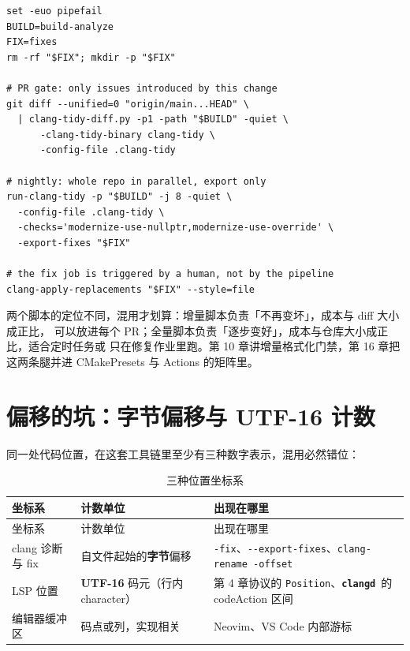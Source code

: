 \documentclass[12pt,a4paper,fontset=fandol]{ctexbook}
\newcommand{\Tp}[1]{\texttt{#1}}
\newcommand{\Opt}[1]{\texttt{-\/-#1}}
\newcommand{\Lib}[1]{\textbf{\texttt{#1}}}
\newcommand{\CD}{\Lib{clangd}}
\begin{document}
\begin{lstlisting}[style=shellstyle,caption={CI 中增量门禁与夜间全量的组合骨架},label={lst:ch14-parallel}]
set -euo pipefail
BUILD=build-analyze
FIX=fixes
rm -rf "$FIX"; mkdir -p "$FIX"

# PR gate: only issues introduced by this change
git diff --unified=0 "origin/main...HEAD" \
  | clang-tidy-diff.py -p1 -path "$BUILD" -quiet \
      -clang-tidy-binary clang-tidy \
      -config-file .clang-tidy

# nightly: whole repo in parallel, export only
run-clang-tidy -p "$BUILD" -j 8 -quiet \
  -config-file .clang-tidy \
  -checks='modernize-use-nullptr,modernize-use-override' \
  -export-fixes "$FIX"

# the fix job is triggered by a human, not by the pipeline
clang-apply-replacements "$FIX" --style=file
\end{lstlisting}

两个脚本的定位不同，混用才划算：增量脚本负责「不再变坏」，成本与 diff 大小成正比，
可以放进每个 PR；全量脚本负责「逐步变好」，成本与仓库大小成正比，适合定时任务或
只在修复作业里跑。第 10 章讲增量格式化门禁，第 16 章把这两条腿并进
CMakePresets 与 Actions 的矩阵里。

\section{偏移的坑：字节偏移与 UTF-16 计数}\label{sec:ch14-s4}

同一处代码位置，在这套工具链里至少有三种数字表示，混用必然错位：

\begin{longtable}{>{\raggedright\arraybackslash}p{}>{\raggedright\arraybackslash}p{}>{\raggedright\arraybackslash}p{}}
\caption{三种位置坐标系}\label{tab:ch14-coord}\\
\toprule
坐标系 & 计数单位 & 出现在哪里 \\
\midrule
\endfirsthead
\toprule
坐标系 & 计数单位 & 出现在哪里 \\
\midrule
\endhead
clang 诊断与 fix & 自文件起始的\textbf{字节}偏移 & \texttt{-fix}、\Opt{export-fixes}、\texttt{clang-rename -offset} \\
LSP 位置 & \textbf{UTF-16} 码元（行内 character） & 第 4 章协议的 \Tp{Position}、\CD\ 的 codeAction 区间 \\
编辑器缓冲区 & 码点或列，实现相关 & Neovim、VS Code 内部游标 \\
\bottomrule
\end{longtable}
\end{document}
